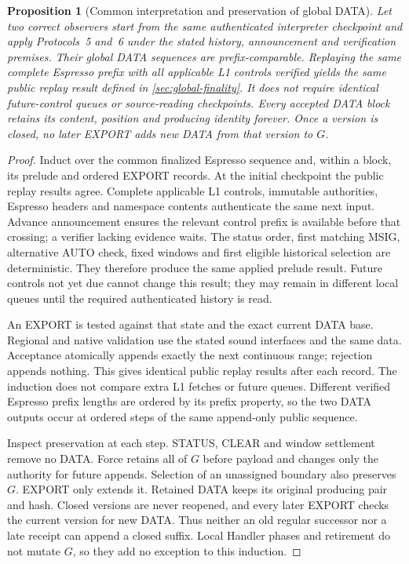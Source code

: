 \documentclass[11pt,a4paper]{article}
\newtheorem{proposition}[proposition]{Proposition}
\begin{document}
\begin{proposition}[Common interpretation and preservation of global DATA]
\label{prop:global-prefix}
Let two correct observers start from the same authenticated interpreter
checkpoint and apply Protocols~5 and~6 under the stated history,
announcement and verification premises. Their global DATA sequences are
prefix-comparable. Replaying the same complete Espresso prefix with all
applicable L1 controls verified yields the same public replay result
defined in \cref{sec:global-finality}. It does not require identical
future-control queues or source-reading checkpoints. Every accepted DATA
block retains its content,
position and producing identity forever. Once a version is closed, no
later EXPORT adds new DATA from that version to $G$.
\end{proposition}
\begin{proof}
Induct over the common finalized Espresso sequence and, within a block,
its prelude and ordered EXPORT records. At the initial checkpoint the
public replay results agree. Complete applicable L1 controls, immutable authorities,
Espresso headers and namespace contents authenticate the same next
input. Advance announcement ensures the relevant control prefix is
available before that crossing; a verifier lacking evidence waits.
The status order, first matching MSIG, alternative AUTO check, fixed
windows and first eligible historical selection are deterministic.
They therefore produce the same applied prelude result. Future controls
not yet due cannot change this result; they may remain in different local
queues until the required authenticated history is read.

An EXPORT is tested against that state and the exact current DATA base.
Regional and native validation use the stated sound interfaces and the
same data. Acceptance atomically appends exactly the next continuous
range; rejection appends nothing. This gives identical public replay
results after each record. The induction does not compare extra L1
fetches or future queues. Different verified Espresso prefix lengths
are ordered by its prefix property, so the two DATA outputs occur at
ordered steps of the same append-only public sequence.

Inspect preservation at each step. STATUS, CLEAR and window settlement
remove no DATA. Force retains all of $G$ before payload and changes only
the authority for future appends. Selection of an unassigned boundary
also preserves $G$. EXPORT only extends it. Retained DATA keeps its
original producing pair and hash. Closed versions are never reopened,
and every later EXPORT checks the current version for new DATA. Thus
neither an old regular successor nor a late receipt can append a closed
suffix. Local Handler phases and retirement do not mutate $G$, so they
add no exception to this induction.
\end{proof}
\end{document}
